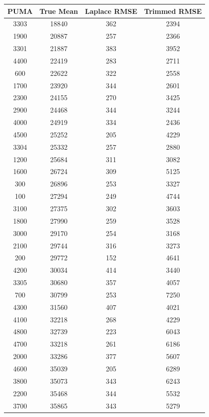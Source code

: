 \documentclass[12pt]{article}
\begin{document}
\begin{longtable}{|c|c|c|c|}
\hline
\textbf{PUMA} & \textbf{True Mean} & \textbf{Laplace RMSE} & \textbf{Trimmed RMSE} \\ \hline
3303 & 18840 & 362 & 2394 \\ \hline
1900 & 20887 & 257 & 2366 \\ \hline
3301 & 21887 & 383 & 3952 \\ \hline
4400 & 22419 & 283 & 2711 \\ \hline
600 & 22622 & 322 & 2558 \\ \hline
1700 & 23920 & 344 & 2601 \\ \hline
2300 & 24155 & 270 & 3425 \\ \hline
2900 & 24468 & 344 & 3244 \\ \hline
4000 & 24919 & 334 & 2436 \\ \hline
4500 & 25252 & 205 & 4229 \\ \hline
3304 & 25332 & 257 & 2880 \\ \hline
1200 & 25684 & 311 & 3082 \\ \hline
1600 & 26724 & 309 & 5125 \\ \hline
300 & 26896 & 253 & 3327 \\ \hline
100 & 27294 & 249 & 4744 \\ \hline
3100 & 27375 & 302 & 3603 \\ \hline
1800 & 27990 & 259 & 3528 \\ \hline
3000 & 29170 & 254 & 3168 \\ \hline
2100 & 29744 & 316 & 3273 \\ \hline
200 & 29772 & 152 & 4641 \\ \hline
4200 & 30034 & 414 & 3440 \\ \hline
3305 & 30680 & 357 & 4057 \\ \hline
700 & 30799 & 253 & 7250 \\ \hline
4300 & 31560 & 407 & 4021 \\ \hline
4100 & 32218 & 268 & 4229 \\ \hline
4800 & 32739 & 223 & 6043 \\ \hline
4700 & 33218 & 261 & 6186 \\ \hline
2000 & 33286 & 377 & 5607 \\ \hline
4600 & 35039 & 205 & 6289 \\ \hline
3800 & 35073 & 343 & 6243 \\ \hline
2200 & 35468 & 344 & 5532 \\ \hline
3700 & 35865 & 343 & 5279 \\ \hline

\end{longtable}
\end{document}
